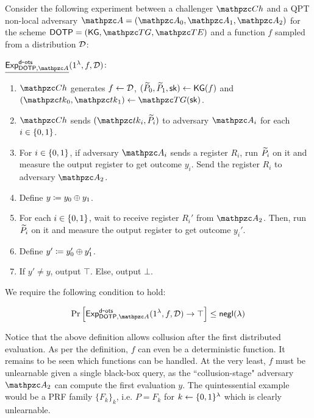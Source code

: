 \begin{definition}
Consider the following experiment between a challenger $\qCh$ and a
QPT non-local adversary $\qA = (\qA_0, \qA_1, \qA_2)$ for the scheme
$\DOTP = (\KG, \TG, \TE)$ and a function $f$ sampled from a
distribution $\mathcal{D}$:

\begin{description}

\item $\underline{\expb{\DOTP, \qA}{d}{ots}}(1^\secp, f, \cD)$:
\begin{enumerate}
\item $\qCh$ generates $f \leftarrow \mathcal{D}$, $(\widetilde{P}_0, \widetilde{P}_1, \mathsf{sk}) \leftarrow
\mathsf{KG}(f)$ and
$(\qtk_0, \qtk_1) \gets \TG(\sk)$.
\item $\qCh$ sends $(\qtk_i, \tP_i)$ to adversary $\qA_i$ for each $i
\in \{0,1\}$.
\item For $i \in \{0,1\}$, if adversary $\qA_i$ sends a register $R_i$,
run $\widetilde{P}_i$ on it and measure the output register to get outcome
$y_i$. Send the register $R_i$ to adversary $\qA_2$.
\item Define $y \coloneqq y_0 \oplus y_1$.
\item For each $i \in \{0,1\}$, wait to receive register $R_i'$ from
$\qA_2$. Then, run $\widetilde{P}_i$ on it and measure the output register
to get outcome $y_i'$.

\item Define $y' \coloneqq y_0' \oplus y_1'$.

\item If $y' \neq y$, output $\top$. Else, output $\bot$.
\end{enumerate}
\end{description}

We require the following condition to hold:


$$\Pr\Big[\expb{\DOTP, \qA}{d}{ots}(1^\secp, f, \cD) \ra \top\Big]
\le \negl(\secp)$$

\end{definition}

Notice that the above definition allows collusion after the first
distributed evaluation. As per the definition, $f$ can even be a
deterministic function. It remains to be seen which functions can be
handled. At the very least, $f$ must be unlearnable given a single
black-box query, as the ``collusion-stage" adversary $\qA_2$ can
compute the first evaluation $y$. The quintessential example would be
a PRF family $\{F_k\}_k$, i.e. $P = F_k$ for $k \leftarrow \{0,1\}^\lambda$
which is clearly unlearnable.

